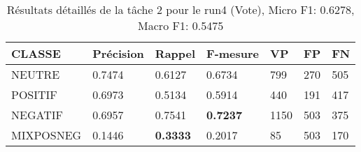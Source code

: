 \begin{center}
\begin{table}
\begin{tabular}{l|l|l|l|l|l|l}
  CLASSE	&Précision	&Rappel	&F-mesure	&VP	&FP	&FN\\
\hline
  NEUTRE	&0.7474	&0.6127	&0.6734	&799	&270	&505\\
  POSITIF	&0.6973	&0.5134	&0.5914	&440	&191	&417\\
  NEGATIF	&0.6957	&0.7541	&\textbf{0.7237}	&1150	&503	&375\\
  MIXPOSNEG	&0.1446	&\textbf{0.3333}	&0.2017	&85	&503	&170\\
\hline
\end{tabular}
\caption{Résultats détaillés de la tâche 2 pour le run4 (Vote),
  Micro F1: 0.6278, Macro F1: 0.5475\label{tab:detail4}}
\end{table}
\end{center}
